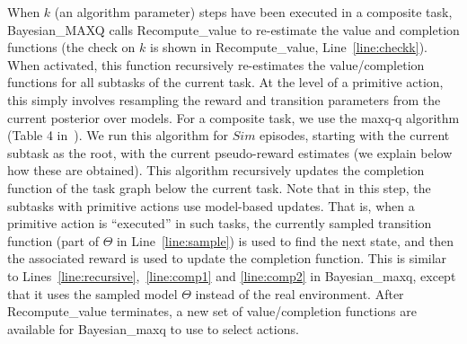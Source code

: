 When $k$ (an algorithm parameter) steps have been executed in a
composite task, {\sc Bayesian\_MAXQ} calls {\sc Recompute\_value} to
re-estimate the value and completion functions (the check on $k$ is
shown in {\sc Recompute\_value}, Line~\ref{line:checkk}). When
activated, this function recursively re-estimates the value/completion
functions for all subtasks of the current task. At the level of a
primitive action, this simply involves resampling the reward and
transition parameters from the current posterior over models. For a
composite task, we use the {\sc maxq-q} algorithm (Table 4
in~\cite{d-hrl-00}). We run this algorithm for $Sim$ episodes,
starting with the current subtask as the root, with the current
pseudo-reward estimates (we explain below how these are obtained).
This algorithm recursively updates the completion function of the task
graph below the current task. Note that in this step, the subtasks
with primitive actions use model-based updates. That is, when a
primitive action is ``executed'' in such tasks, the currently sampled
transition function (part of $\Theta$ in Line~\ref{line:sample}) is
used to find the next state, and then the associated reward is used to
update the completion function. This is similar to
Lines~\ref{line:recursive},~\ref{line:comp1} and \ref{line:comp2} in
{\sc Bayesian\_maxq}, except that it uses the sampled model $\Theta$
instead of the real environment. After {\sc Recompute\_value}
terminates, a new set of value/completion functions are available for
{\sc Bayesian\_maxq} to use to select actions.

